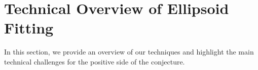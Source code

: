 \documentclass[12pt]{article}
\newcommand{\Lovasz}{Lov\'asz\xspace}
\begin{document}
\section{Technical Overview of Ellipsoid Fitting}
% 

In this section, we provide an overview of our techniques and highlight the main technical challenges for the positive side of the conjecture.
%
%
%
%
\end{document}
